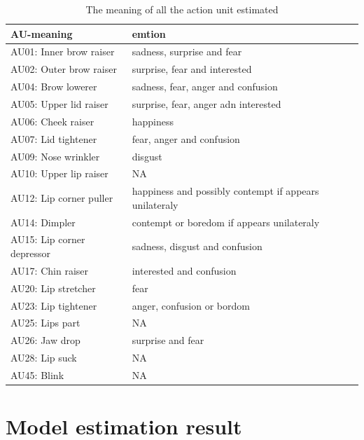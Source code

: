 \documentclass{monashthesis}
\begin{document}
\begin{table}[ht]
\begin{center}
\caption{\label{tab:au_meaning} The meaning of all the action unit estimated}
\begin{tabular}{ll}
\toprule
AU-meaning & emtion \\
\midrule
AU01: Inner brow raiser & sadness, surprise and fear \\
AU02: Outer brow raiser & surprise, fear and interested \\
AU04: Brow lowerer & sadness, fear, anger and confusion \\
AU05: Upper lid raiser & surprise, fear, anger adn interested \\
AU06: Cheek raiser & happiness \\
AU07: Lid tightener & fear, anger and confusion \\
AU09: Nose wrinkler & disgust \\
AU10: Upper lip raiser & NA \\
AU12: Lip corner puller & happiness and possibly contempt if appears unilateraly \\
AU14: Dimpler & contempt or boredom if appears unilateraly \\
AU15: Lip corner depressor & sadness, disgust and confusion \\
AU17: Chin raiser & interested and confusion \\
AU20: Lip stretcher & fear \\
AU23: Lip tightener & anger, confusion or bordom \\
AU25: Lips part & NA \\
AU26: Jaw drop & surprise and fear \\
AU28: Lip suck & NA \\
AU45: Blink & NA \\
\bottomrule
\end{tabular}
\end{center}
\end{table}

\hypertarget{model-estimation-result}{%
\section{Model estimation result}\label{model-estimation-result}}
\end{document}
